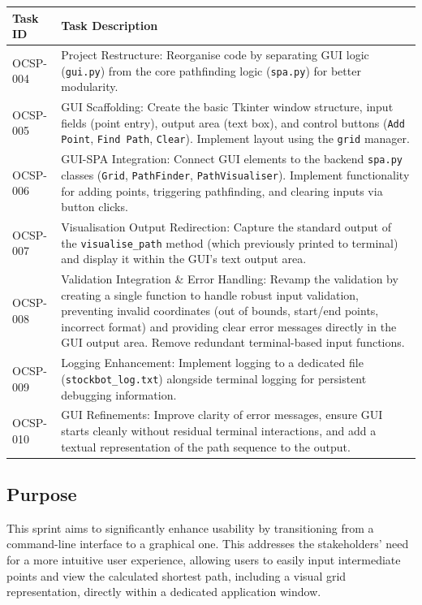 \begin{table}[htbp]
	\centering
	\begin{tabularx}{\textwidth}{|l|X|}
		\hline
		\textbf{Task ID} & \textbf{Task Description} \\
		\hline
		OCSP-004 & Project Restructure: Reorganise code by separating GUI logic (\verb|gui.py|) from the core pathfinding logic (\verb|spa.py|) for better modularity. \\
		\hline
		OCSP-005 & GUI Scaffolding: Create the basic Tkinter window structure, input fields (point entry), output area (text box), and control buttons (\verb|Add Point|, \verb|Find Path|, \verb|Clear|). Implement layout using the \verb|grid| manager. \\
		\hline
		OCSP-006 & GUI-SPA Integration: Connect GUI elements to the backend \verb|spa.py| classes (\verb|Grid|, \verb|PathFinder|, \verb|PathVisualiser|). Implement functionality for adding points, triggering pathfinding, and clearing inputs via button clicks. \\
		\hline
		OCSP-007 & Visualisation Output Redirection: Capture the standard output of the \verb|visualise_path| method (which previously printed to terminal) and display it within the GUI's text output area. \\
		\hline
		OCSP-008 & Validation Integration \& Error Handling: Revamp the validation by creating a single function to handle robust input validation, preventing invalid coordinates (out of bounds, start/end points, incorrect format) and providing clear error messages directly in the GUI output area. Remove redundant terminal-based input functions. \\
		\hline
		OCSP-009 & Logging Enhancement: Implement logging to a dedicated file (\verb|stockbot_log.txt|) alongside terminal logging for persistent debugging information. \\
		\hline
		OCSP-010 & GUI Refinements: Improve clarity of error messages, ensure GUI starts cleanly without residual terminal interactions, and add a textual representation of the path sequence to the output. \\
		\hline
	\end{tabularx}
\end{table}

\subsection{Purpose}

This sprint aims to significantly enhance usability by transitioning from a command-line interface to a graphical one. This addresses the stakeholders' need for a more intuitive user experience, allowing users to easily input intermediate points and view the calculated shortest path, including a visual grid representation, directly within a dedicated application window.

